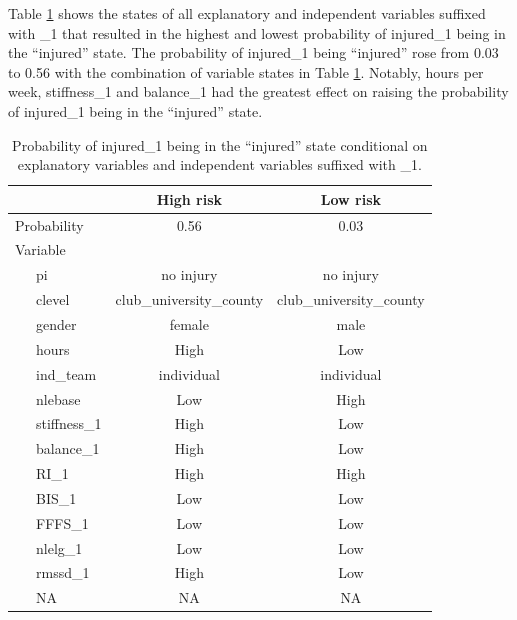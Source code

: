 \documentclass[
  english,
  man,floatsintext]{apa6}
\begin{document}
Table \ref{tab:fullnetworkquery1} shows the states of all explanatory and independent variables suffixed with \_1 that resulted in the highest and lowest probability of injured\_1 being in the \enquote{injured} state.
The probability of injured\_1 being \enquote{injured} rose from 0.03 to 0.56 with the combination of variable states in Table \ref{tab:fullnetworkquery1}. Notably, hours per week, stiffness\_1 and balance\_1 had the greatest effect on raising the probability of injured\_1 being in the \enquote{injured} state.

\begin{table}[H]

\begin{center}
\begin{threeparttable}

\caption{\label{tab:fullnetworkquery1}Probability of injured\_1 being in the ``injured'' state conditional on explanatory variables and independent variables suffixed with \_1.}

\begin{tabular}{lcc}
\toprule
 & High risk & Low risk\\
\midrule
Probability & 0.56 & 0.03\\
Variable &  & \\
\ \ \ pi & no injury & no injury\\
\ \ \ clevel & club\_university\_county & club\_university\_county\\
\ \ \ gender & female & male\\
\ \ \ hours & High & Low\\
\ \ \ ind\_team & individual & individual\\
\ \ \ nlebase & Low & High\\
\ \ \ stiffness\_1 & High & Low\\
\ \ \ balance\_1 & High & Low\\
\ \ \ RI\_1 & High & High\\
\ \ \ BIS\_1 & Low & Low\\
\ \ \ FFFS\_1 & Low & Low\\
\ \ \ nlelg\_1 & Low & Low\\
\ \ \ rmssd\_1 & High & Low\\
\ \ \ NA & NA & NA\\
\bottomrule
\end{tabular}

\end{threeparttable}
\end{center}

\end{table}
\end{document}
